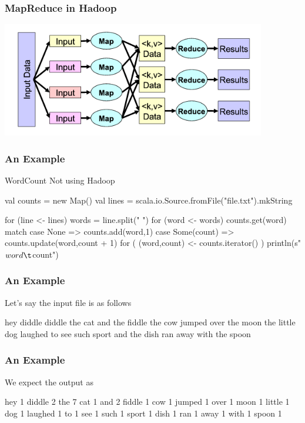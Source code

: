 \documentclass{beamer}
\newcommand{\beb}{\begin{exampleblock}}
\newcommand{\eeb}{\end{exampleblock}}
\begin{document}
\begin{frame}[fragile]
\frametitle{MapReduce in Hadoop}


\includegraphics[height=5cm]{pic/mapreduce.png} 

\end{frame}



\begin{frame}[fragile]
\frametitle{An Example}
\beb{WordCount Not using Hadoop}
{\scriptsize
\begin{code}
val counts = new Map()
val lines = scala.io.Source.fromFile("file.txt").mkString

for (line <- lines) {
    words = line.split(" ")
    for (word <- words) {
        counts.get(word) match 
        { case None => counts.add(word,1)
          case Some(count) => counts.update(word,count + 1)
        }
    }
}
for ( (word,count) <- counts.iterator() ) {
    println(s"$word \t $count")
}\end{code}
}
\eeb
\end{frame}


\begin{frame}[fragile]
\frametitle{An Example}

Let's say the input file is as follows
\beb{}
\begin{code}
hey diddle diddle
the cat and the fiddle
the cow jumped over the 
 moon
the little dog laughed
to see such sport
and the dish ran away 
 with the spoon
\end{code}
\eeb
\end{frame}



\begin{frame}[fragile]
\frametitle{An Example}
We expect the output as 
\beb{}
{\scriptsize
\begin{code}
hey	1
diddle	2
the	7
cat	1 
and	2
fiddle	1
cow	1 
jumped	1
over	1
moon	1
little	1
dog	1
laughed	1
to	1 
see	1
such	1
sport	1
dish	1
ran	1 
away	1
with	1 
spoon	1
\end{code}
}
\eeb
\end{frame}
\end{document}
